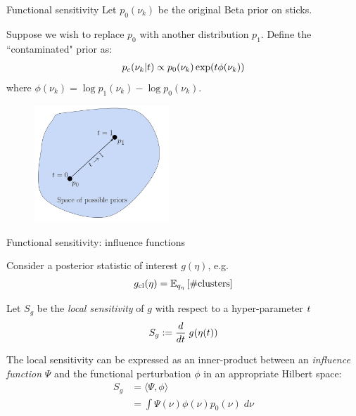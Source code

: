 \begin{frame}{Functional sensitivity}
Let $p_0(\nu_k)$ be the original Beta prior on sticks.

Suppose we wish to replace $p_0$ with another distribution $p_1$. Define the ``contaminated" prior as:
\begin{align*}
p_c(\nu_k \vert t) \propto
p_{0}(\nu_k)\exp(t\phi(\nu_k))
\end{align*}
where $\phi(\nu_k) = \log p_1(\nu_k) - \log p_0(\nu_k)$.

\begin{figure}[!h]
\centering
\includegraphics[width = 0.45\textwidth]{./figures/static_figures/functional_perturbation2.png}
\setlength{\textfloatsep}{-10pt}
\end{figure}

\end{frame}

\begin{frame}{Functional sensitivity: influence functions}

Consider a posterior statistic of interest $g(\eta)$, e.g.
\begin{align*}
g_{\textrm{cl}}(\eta) = \mathbb{E}_{q_{\eta}} \left[ \#\text{clusters} \right]
\end{align*}

Let $S_g$ be the \textit{local sensitivity} of $g$ with respect to a hyper-parameter $t$
\begin{align*}
S_g := \frac{d}{dt} \; g(\eta(t))
\end{align*}

\pause

The local sensitivity can be expressed as an inner-product between an \textit{influence function} $\Psi$
and the functional perturbation $\phi$ in an appropriate Hilbert space:
\begin{align*}
S_g &= \langle \Psi, \phi\rangle \\
&= \int \Psi(\nu) \phi(\nu) p_0(\nu) \;d\nu
\end{align*}


\end{frame}

